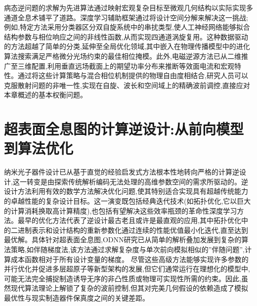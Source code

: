 \documentclass[11pt]{article}
\begin{document}
病态逆问题的求解为先进算法通过映射宏观复杂目标至微观几何结构以实际实现多通道全息术铺平了道路。深度学习辅助框架通过将设计空间分解来解决这一挑战;例如,特定方法采用分类器区分双自旋系统中的串扰类型,使人工神经网络能够拟合结构参数与相位响应之间的非线性函数,从而实现四通道涡旋复用。这种数据驱动的方法超越了简单的分类,延伸至全局优化领域,其中嵌入在物理传播模型中的进化算法搜索满足严格微分光场约束的最佳相位掩模。此外,电磁逆源方法已从二维推广至三维配置,利用垂直远场截面上的期望功率分布来推断等效面电流和宏观特性。通过将这些计算策略与混合相位机制提供的物理自由度相结合,研究人员可以克服散射问题的非唯一性,实现在自旋、波长和空间域上的精确波前调控,直接应对本章概述的基本权衡问题。\citep{doi_10_1117_1_apn_2_1_016010_57069347} \citep{doi_10_1117_12_3110717_26d5b63b} \citep{doi_10_1109_lawp_2023_3266337_3b44a88a}

\section{超表面全息图的计算逆设计:从前向模型到算法优化}\label{ux8d85ux8868ux9762ux5168ux606fux56feux7684ux8ba1ux7b97ux9006ux8bbeux8ba1ux4eceux524dux5411ux6a21ux578bux5230ux7b97ux6cd5ux4f18ux5316}

纳米光子器件设计已从基于直觉的经验启发式方法根本性地转向严格的计算逆设计,这一转变是由探索传统解析编码无法处理的高维参数空间的需求所驱动的。逆设计方法利用有效的数学方法解决优化问题,使其特别适合实现具有超越传统能力的卓越性能的复杂设计目标。这一演变既包括经典迭代技术(如拓扑优化,它以巨大的计算消耗换取高计算精度),也包括有望解决这些效率瓶颈的革命性深度学习方法。最早的优化方法代表了逆设计最古老且或许是最直观的应用,其中拓扑优化中的二进制表示和设计结构的重新参数化通过连续的性能优值最小化迭代,直至达到最优解。具体针对超表面全息图,ODNN研究已从简单的解析叠加发展到复杂的算法策略,如伴随梯度法,该方法通过求解复杂度与单次前向模拟相似的''伴随问题'',计算成本函数相对于所有设计变量的梯度。\citep{doi_10_48550_arxiv_2603_15210_fdcfb92f} \citep{doi_10_1038_s41598_024_67142_2_db612126} 尽管这些高级方法能够实现许多参数的并行优化并促进多层超原子等新型架构的发展,但它们通常运行在理想化的模型中,可能无法完全捕捉制造诱导无序的非凸性质或物理可实现性所需的约束。因此,虽然现代算法理论上解锁了复杂的波前控制,但其对完美几何假设的依赖造成了模拟最优性与现实制造器件保真度之间的关键差距。\citep{doi_10_1088_1361_6439_ad3a72_72d60f33} \citep{doi_10_1364_oe_27_030308_704a1c9b} \citep{s2_76a83ea3baed75ad88b7f0782eb9a694a330c853_cee16cac} \citep{doi_10_1515_nanoph_2021_0660_2d91a441}
\end{document}
